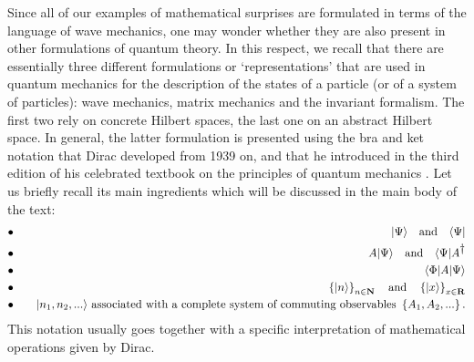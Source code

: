 \documentclass[12pt]{report}
\begin{document}
Since all of our examples of mathematical surprises 
are formulated in terms of  
the language of wave mechanics, one may wonder whether 
they are also present in other formulations of quantum theory.
In this respect, we recall that 
there are essentially three
different formulations or `representations' that are used 
in quantum mechanics for the description of the states of
a particle (or of a system of particles): wave mechanics,
matrix mechanics and the invariant formalism.
The first two rely on concrete Hilbert spaces, the
last one on an abstract Hilbert space. In general,
the latter formulation is presented using the
bra and ket notation that  Dirac developed from  
1939 on, and that he introduced 
in the third edition of his celebrated 
textbook on the principles of quantum mechanics
\cite{d}.
 Let us briefly
recall its main
ingredients which will be discussed in the main body of the 
text:
\begin{eqnarray*}
& \bullet & \quad
| \Psi \rangle \quad {\rm and} \quad \langle \Psi |
\\
& \bullet & \quad
A | \Psi \rangle \quad {\rm and} \quad \langle \Psi |A^{\displaystyle{\dagger}}
\\
& \bullet & \quad
\langle \Phi |A|\Psi  \rangle
\\
& \bullet & \quad
\left\{ |n \rangle \right\}_{n \in {\bf N} }
\quad {\rm and} \quad
\left\{ |x \rangle \right\}_{x \in {\bf R} }
\\
& \bullet & \quad
|n_1, n_2,... \rangle
\ \mbox{associated with a complete 
system of commuting observables} 
\ \left\{ A_1, A_2 ,... \right\}
.
\end{eqnarray*}
This notation usually goes together
with a specific interpretation of mathematical
operations given by Dirac.
\end{document}
